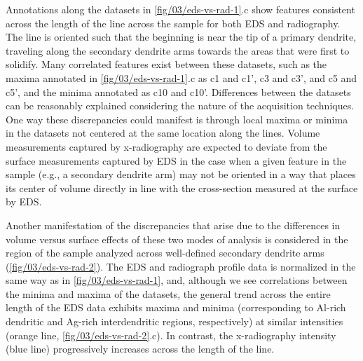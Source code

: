 Annotations along the datasets in \ref{fig/03/eds-vs-rad-1}.c show
features consistent across
the length of the line across the sample for both EDS and radiography. The
line is oriented such that the beginning is near the tip of a primary
dendrite, traveling along the secondary dendrite arms towards the areas
that were first to solidify. Many correlated features exist between these
datasets, such as the maxima annotated in \ref{fig/03/eds-vs-rad-1}.c
as c1 and c1', c3 and
c3', and c5 and c5', and the minima annotated as c10 and c10'. Differences
between the datasets can be reasonably explained considering the nature of
the acquisition techniques. One way these discrepancies could manifest is
through local maxima or minima in the datasets not centered at the same
location along the lines. Volume measurements captured by x-radiography
are expected to deviate from the surface measurements captured by EDS in
the case when a given feature in the sample (e.g., a secondary dendrite
arm) may not be oriented in a way that places its center of volume
directly in line with the cross-section measured at the surface by EDS.

Another manifestation of the discrepancies that arise due to the
differences in volume versus surface effects of these two modes of
analysis is considered in the region of the sample analyzed across
well-defined secondary dendrite arms (\ref{fig/03/eds-vs-rad-2}).
The EDS and radiograph profile data is normalized in the same way as in
\ref{fig/03/eds-vs-rad-1}, and, although we
see correlations between the minima and maxima of the datasets, the
general trend across the entire length of the EDS data exhibits maxima and
minima (corresponding to Al-rich dendritic and Ag-rich interdendritic
regions, respectively) at similar intensities
(orange line, \ref{fig/03/eds-vs-rad-2}.c). In
contrast, the x-radiography intensity (blue line) progressively increases
across the length of the line.

